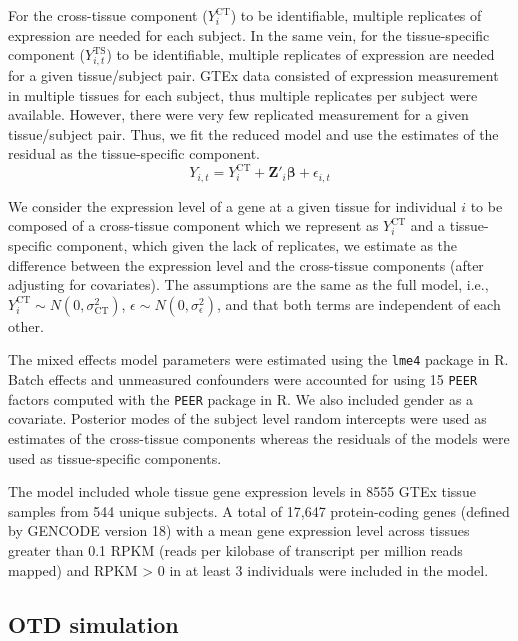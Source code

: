 \documentclass[10pt,letterpaper]{article}
\begin{document}
For the cross-tissue component ($Y_{i}^{\text{CT}}$) to be identifiable, multiple replicates of expression are needed for each subject. In the same vein, for the tissue-specific component ($Y_{i,t}^{\text{TS}} $) to be identifiable, multiple replicates of expression are needed for a given tissue/subject pair. GTEx\cite{Ardlie_2015} data consisted of expression measurement in multiple tissues for each subject, thus multiple replicates per subject were available. However, there were very few replicated measurement for a given tissue/subject pair. Thus, we fit the reduced model and use the estimates of the residual as the tissue-specific component.
%
\[Y_{i,t} =  Y_{i}^{\text{CT}}   + \mathbf{Z}'_i \boldsymbol{\beta} + \epsilon_{i,t}  \] 
%

We consider the expression level of a gene at a given tissue for individual $i$ to be composed of a cross-tissue component which we represent as $Y_i^{\text{CT}}$ and a tissue-specific component, which given the lack of replicates, we estimate as the difference between the expression level and the cross-tissue components (after adjusting for covariates). The assumptions are the same as the full model, i.e., $Y_{i}^{\text{CT}} \sim N(0,\sigma_{\text{CT}}^2)$, $\epsilon \sim N(0,\sigma^2_{\epsilon})$, and that both terms are independent of each other. 

The mixed effects model parameters were estimated using the \texttt{lme4} package \cite{Bates_2015a} in R. Batch effects and unmeasured confounders were accounted for using 15 \texttt{PEER} factors computed with the \texttt{PEER} \cite{Stegle_2012} package in R. 
We also included gender as a covariate.
Posterior modes of the subject level random intercepts were used as estimates of the cross-tissue components whereas the residuals of the models were used as tissue-specific components.

The model included whole tissue gene expression levels in 8555 GTEx
tissue samples from 544 unique subjects. A total of 17,647
protein-coding genes (defined by GENCODE \cite{Harrow_2012} version 18) with a
mean gene expression level across tissues greater than 0.1 RPKM (reads
per kilobase of transcript per million reads mapped) and RPKM \textgreater{} 0 in at least 3 individuals were included in
the model. 

\subsection*{OTD simulation}
\end{document}
